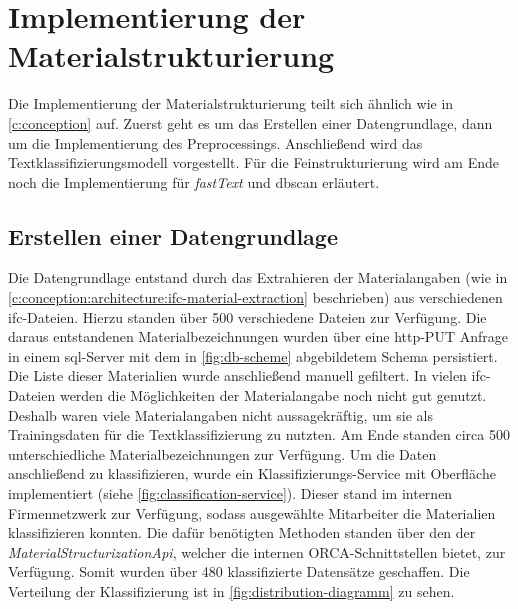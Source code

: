 \section{Implementierung der Materialstrukturierung}
\label{c:implementation:structuring}
Die Implementierung der Materialstrukturierung teilt sich ähnlich wie in \autoref{c:conception} auf. Zuerst geht es um das Erstellen einer Datengrundlage, dann um die Implementierung des Preprocessings. Anschließend wird das Textklassifizierungsmodell vorgestellt. Für die Feinstrukturierung wird am Ende noch die Implementierung für \textit{fastText} und \ac{dbscan} erläutert.
\subsection{Erstellen einer Datengrundlage}
\label{c:implementation:data} 
Die Datengrundlage entstand durch das Extrahieren der Materialangaben (wie in \autoref{c:conception:architecture:ifc-material-extraction} beschrieben) aus verschiedenen \ac{ifc}-Dateien. Hierzu standen über 500 verschiedene Dateien zur Verfügung. Die daraus entstandenen Materialbezeichnungen wurden über eine \ac{http}-PUT Anfrage in einem \ac{sql}-Server mit dem in \autoref{fig:db-scheme} abgebildetem Schema persistiert. Die Liste dieser Materialien wurde anschließend manuell gefiltert. In vielen \ac{ifc}-Dateien werden die Möglichkeiten der Materialangabe noch nicht gut genutzt. Deshalb waren viele Materialangaben nicht aussagekräftig, um sie als Trainingsdaten für die Textklassifizierung zu nutzten. Am Ende standen circa 500 unterschiedliche Materialbezeichnungen zur Verfügung.
Um die Daten anschließend zu klassifizieren, wurde ein Klassifizierungs-Service mit Oberfläche implementiert (siehe  \autoref{fig:classification-service}). Dieser stand im internen Firmennetzwerk zur Verfügung, sodass ausgewählte Mitarbeiter die Materialien klassifizieren konnten. Die dafür benötigten Methoden standen über den  der \textit{MaterialStructurizationApi}, welcher die internen ORCA-Schnittstellen bietet, zur Verfügung. Somit wurden über 480 klassifizierte Datensätze geschaffen. Die Verteilung der Klassifizierung ist in \autoref{fig:distribution-diagramm} zu sehen.

